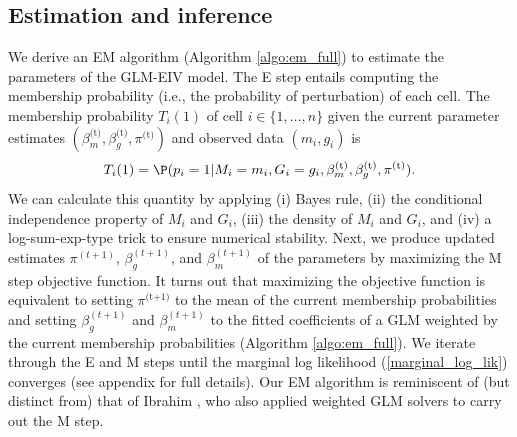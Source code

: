 \documentclass[12pt]{article}
\begin{document}
\subsection{Estimation and inference}

We derive an EM algorithm (Algorithm \ref{algo:em_full}) to estimate the parameters of the GLM-EIV model. The E step entails computing the membership probability (i.e., the probability of perturbation) of each cell. The membership probability $T_i(1)$ of cell $i \in \{1, \dots, n\}$ given the current parameter estimates $(\beta_m^\textrm{(t)}, \beta_g^\textrm{(t)}, \pi^\textrm{(t)})$ and observed data $(m_i, g_i)$ is
$$T_i(1) = \P(p_i = 1| M_i = m_i, G_i = g_i, \beta^\textrm{(t)}_m, \beta^\textrm{(t)}_g, \pi^\textrm{(t)}).$$ We can calculate this quantity by applying (i) Bayes rule, (ii) the conditional independence property of $M_i$ and $G_i$, (iii) the density of $M_i$ and $G_i$, and (iv) a log-sum-exp-type trick to ensure numerical stability. Next, we produce updated estimates $\pi^{(t +1)}$, $\beta_g^{(t+1)}$, and $\beta_m^{(t+1)}$ of the parameters by maximizing the M step objective function. It turns out that maximizing the objective function is equivalent to setting $\pi^{\textrm{(t+1)}}$ to the mean of the current membership probabilities and setting $\beta_g^{(t+1)}$ and $\beta_m^{(t+1)}$ to the fitted coefficients of a GLM weighted by the current membership probabilities (Algorithm \ref{algo:em_full}). We iterate through the E and M steps until the marginal log likelihood (\ref{marginal_log_lik}) converges (see appendix for full details). Our EM algorithm is reminiscent of (but distinct from) that of Ibrahim \cite{Ibrahim1990}, who also applied weighted GLM solvers to carry out the M step.
\end{document}
